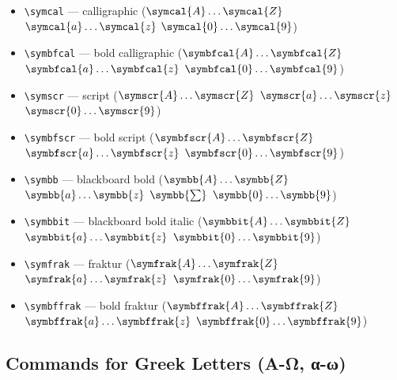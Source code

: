 \documentclass[12pt,a4paper]{article}
\begin{document}
\begin{itemize}
    \item \texttt{\textbackslash{}symcal} --- calligraphic ($\symcal{A} \ldots \symcal{Z}$ $\symcal{a} \ldots \symcal{z}$ $\symcal{0} \ldots \symcal{9}$)
    \item \texttt{\textbackslash{}symbfcal} --- bold calligraphic ($\symbfcal{A} \ldots \symbfcal{Z}$ $\symbfcal{a} \ldots \symbfcal{z}$ $\symbfcal{0} \ldots \symbfcal{9}$)
    \item \texttt{\textbackslash{}symscr} --- script ($\symscr{A} \ldots \symscr{Z}$ $\symscr{a} \ldots \symscr{z}$ $\symscr{0} \ldots \symscr{9}$)
    \item \texttt{\textbackslash{}symbfscr} --- bold script ($\symbfscr{A} \ldots \symbfscr{Z}$ $\symbfscr{a} \ldots \symbfscr{z}$ $\symbfscr{0} \ldots \symbfscr{9}$)
    \item \texttt{\textbackslash{}symbb} --- blackboard bold ($\symbb{A} \ldots \symbb{Z}$ $\symbb{a} \ldots \symbb{z}$ $\symbb{\sum}$ $\symbb{0} \ldots \symbb{9}$)
    \item \texttt{\textbackslash{}symbbit} --- blackboard bold italic ($\symbbit{A} \ldots \symbbit{Z}$ $\symbbit{a} \ldots \symbbit{z}$ $\symbbit{0} \ldots \symbbit{9}$)
    \item \texttt{\textbackslash{}symfrak} --- fraktur ($\symfrak{A} \ldots \symfrak{Z}$ $\symfrak{a} \ldots \symfrak{z}$ $\symfrak{0} \ldots \symfrak{9}$)
    \item \texttt{\textbackslash{}symbffrak} --- bold fraktur ($\symbffrak{A} \ldots \symbffrak{Z}$ $\symbffrak{a} \ldots \symbffrak{z}$ $\symbffrak{0} \ldots \symbffrak{9}$)
\end{itemize}

\subsection*{Commands for Greek Letters (Α-Ω, α-ω)}
\end{document}
